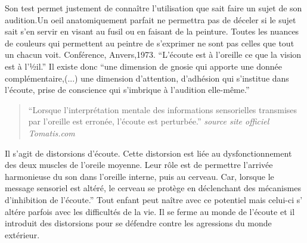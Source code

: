 \documentclass[12pt,french]{report}
\makeatletter
\let\SF@@footnote\footnote
\def\footnote{\ifx\protect\@typeset@protect
    \expandafter\SF@@footnote
  \else
    \expandafter\SF@gobble@opt
  \fi
}
\edef\SF@gobble@opt{\noexpand\protect
  \expandafter\noexpand\csname SF@gobble@opt \endcsname}
\makeatother
\begin{document}
Son test permet justement de connaître l'utilisation que sait faire
un sujet de son audition.Un oeil anatomiquement parfait ne permettra
pas de déceler si le sujet sait s'en servir en visant au fusil ou
en faisant de la peinture. Toutes les nuances de couleurs qui permettent
au peintre de s'exprimer ne sont pas celles que tout un chacun voit.\footnote{Conférence, Anvers,1973.}
``L'écoute est à l\textquoteright oreille ce que la vision est à
l'½il.'' Il existe donc ``une dimension de gnosie qui apporte une
donnée complémentaire,(...) une dimension d'attention, d\textquoteright adhésion
qui s'institue dans l'écoute, prise de conscience qui s\textquoteright imbrique
à l'audition elle-même.'' 
\begin{quotation}
``Lorsque l'interprétation mentale des informations sensorielles
transmises par l'oreille est erronée, l'écoute est perturbée.''\footnote{\emph{source site officiel Tomatis.com}}
\end{quotation}
Il s'agit de distorsions d'écoute. Cette distorsion est liée au dysfonctionnement
des deux muscles de l'oreile moyenne. Leur rôle est de permettre l'arrivée
harmonieuse du son dans l'oreille interne, puis au cerveau. Car, lorsque
le message sensoriel est altéré, le cerveau se protège en déclenchant
des mécanismes d'inhibition de l'écoute.'' Tout enfant peut naître
avec ce potentiel mais celui-ci s' altére parfois avec les difficultés
de la vie. Il se ferme au monde de l'écoute et il introduit des distorsions
pour se défendre contre les agressions du monde extérieur. 
\end{document}
